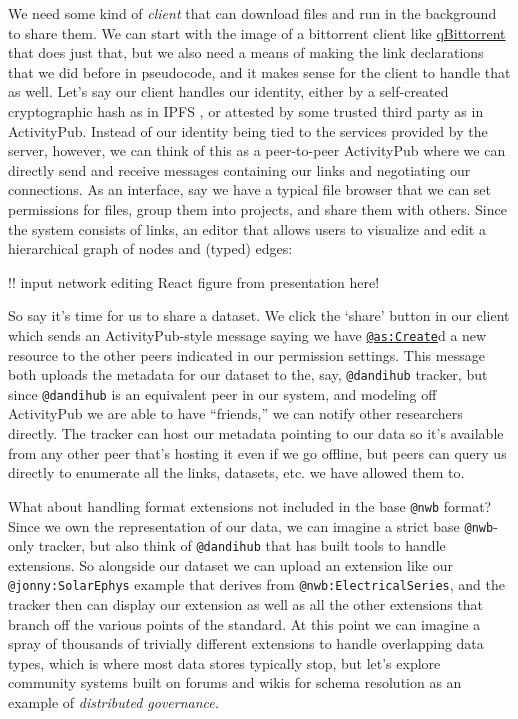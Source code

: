 \documentclass[10pt]{tufte-book}
\begin{document}
We need some kind of \emph{client} that can download files and run in
the background to share them. We can start with the image of a
bittorrent client like \href{https://www.qbittorrent.org/}{qBittorrent}
that does just that, but we also need a means of making the link
declarations that we did before in pseudocode, and it makes sense for
the client to handle that as well. Let's say our client handles our
identity, either by a self-created cryptographic hash as in IPFS\citep{benetIPFSContentAddressed2014} , or attested by some trusted
third party as in ActivityPub. Instead of our identity being tied to the
services provided by the server, however, we can think of this as a
peer-to-peer ActivityPub where we can directly send and receive messages
containing our links and negotiating our connections. As an interface,
say we have a typical file browser that we can set permissions for
files, group them into projects, and share them with others. Since the
system consists of links, an editor that allows users to visualize and
edit a hierarchical graph of nodes and (typed) edges:

!! input network editing React figure from presentation here!

So say it's time for us to share a dataset. We click the `share' button
in our client which sends an ActivityPub-style message saying we have
\href{https://www.w3.org/TR/activitystreams-vocabulary/\#dfn-create}{\texttt{@as:Create}}d
a new resource to the other peers indicated in our permission settings.
This message both uploads the metadata for our dataset to the, say,
\texttt{@dandihub} tracker, but since \texttt{@dandihub} is an
equivalent peer in our system, and modeling off ActivityPub we are able
to have ``friends,'' we can notify other researchers directly. The
tracker can host our metadata pointing to our data so it's available
from any other peer that's hosting it even if we go offline, but peers
can query us directly to enumerate all the links, datasets, etc. we have
allowed them to.

What about handling format extensions not included in the base
\texttt{@nwb} format? Since we own the representation of our data, we
can imagine a strict base \texttt{@nwb}-only tracker, but also think of
\texttt{@dandihub} that has built tools to handle extensions. So
alongside our dataset we can upload an extension like our
\texttt{@jonny:SolarEphys} example that derives from
\texttt{@nwb:ElectricalSeries}, and the tracker then can display our
extension as well as all the other extensions that branch off the
various points of the standard. At this point we can imagine a spray of
thousands of trivially different extensions to handle overlapping data
types, which is where most data stores typically stop, but let's explore
community systems built on forums and wikis for schema resolution as an
example of \emph{distributed governance.}
\end{document}

